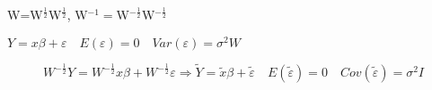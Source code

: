 \documentclass{article}
\begin{document}
\bigskip 

W=W$^{\frac{1}{2}}$W$^{\frac{1}{2}}$, W$^{-1}=$W$^{-\frac{1}{2}}$W$^{-\frac{1%
}{2}}$

$Y=x\beta +\varepsilon \quad E\left( \varepsilon \right) =0\quad Var\left(
\varepsilon \right) =\sigma ^{2}W$

\begin{equation*}
W^{-\frac{1}{2}}Y=W^{-\frac{1}{2}}x\beta +W^{-\frac{1}{2}}\varepsilon
\Rightarrow \tilde{Y}=\tilde{x}\beta +\tilde{\varepsilon}\quad E\left( 
\tilde{\varepsilon}\right) =0\quad Cov\left( \tilde{\varepsilon}\right)
=\sigma ^{2}I
\end{equation*}
\end{document}

